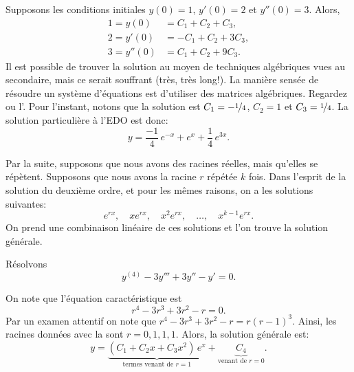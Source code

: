 \begin{example}
	Supposons les conditions initiales $y(0) = 1$, $y'(0) = 2$ et $y''(0) = 3$.  
	Alors,
	\begin{align*}
		1 = y(0) & = C_1 + C_2 + C_3 , \\
		2 = y'(0) & = -C_1 + C_2 + 3C_3 , \\
		3 = y''(0) & = C_1 + C_2 + 9C_3 .
	\end{align*}
	Il est possible de trouver la solution au moyen de techniques algébriques vues au secondaire, mais ce serait souffrant (très, très long!). La manière sensée de résoudre un système d'équations est d'utiliser des matrices algébriques. Regardez  ou l'.
	Pour l'instant, notons que la solution est  
	$C_1 = -\nicefrac{1}{4}$, $C_2 = 1$ et $C_3 = \nicefrac{1}{4}$.  
	La solution particulière à l'EDO est donc:
	\begin{equation*}
		y = \frac{-1}{4}\, e^{-x} + e^x + \frac{1}{4}\, e^{3x} .
	\end{equation*}
\end{example}

Par la suite, supposons que nous avons des racines réelles, mais qu'elles se répètent. 
Supposons que nous avons la racine $r$ répétée $k$ fois. 
Dans l'esprit de la solution du deuxième ordre, et pour les mêmes raisons, on a les solutions suivantes: 
\begin{equation*}
	e^{rx}, \quad xe^{rx}, \quad x^2 e^{rx}, \quad \ldots, \quad x^{k-1} e^{rx} .
\end{equation*}
On prend une combinaison linéaire de ces solutions et l'on trouve la solution générale. 
\begin{example}
	Résolvons
	\begin{equation*}
		y^{(4)} - 3 y''' + 3 y'' - y' =  0 .
	\end{equation*}
	
	On note que l'équation caractéristique est 
	\begin{equation*}
		r^4 - 3r^3 + 3r^2 -r = 0 .
	\end{equation*}
	Par un examen attentif on note que  $r^4 - 3r^3 + 3r^2 -r = r{(r-1)}^3$.  
	Ainsi, les racines données avec la 
	 sont $r = 0, 1, 1, 1$.  
	Alors, la solution générale est: 
	\begin{equation*}
		y = \underbrace{(C_1 + C_2 x + C_3 x^2)\, e^x}_{\text{termes venant de }r=1} 
			+ \underbrace{C_4}_{\text{venant de } r=0} .
	\end{equation*}
\end{example}

